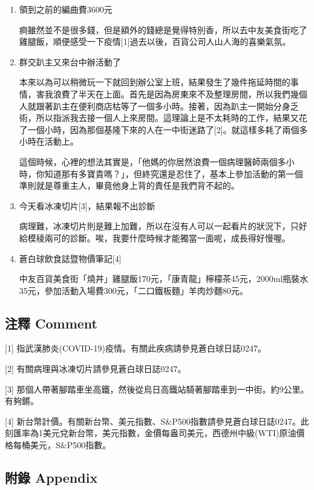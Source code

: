 \documentclass[a5paper, 11pt
]{book}
\begin{document}
\begin{enumerate}
\def\labelenumi{\arabic{enumi}.}
\item
  領到之前的編曲費3600元

  痾雖然並不是很多錢，但是額外的錢總是覺得特別香，所以去中友美食街吃了雞腿飯，順便感受一下疫情{[}1{]}過去以後，百貨公司人山人海的喜樂氣氛。
\item
  群交趴主又來台中辦活動了

  本來以為可以稍微玩一下就回到辦公室上班，結果發生了幾件拖延時間的事情，害我浪費了半天在上面。首先是因為房東來不及整理房間，所以我們幾個人就跟著趴主在便利商店枯等了一個多小時。接著，因為趴主一開始分身乏術，所以指派我去接一個人上來房間。這理論上是不太耗時的工作，結果又花了一個小時，因為那個基隆下來的人在一中街迷路了{[}2{]}。就這樣多耗了兩個多小時在活動上。

  這個時候，心裡的想法其實是，「他媽的你居然浪費一個病理醫師兩個多小時，你知道那有多寶貴嗎？」，但終究還是忍住了，基本上參加活動的第一個準則就是尊重主人，畢竟他身上背的責任是我們背不起的。
\item
  今天看冰凍切片{[}3{]}，結果報不出診斷

  病理難，冰凍切片則是難上加難，所以在沒有人可以一起看片的狀況下，只好給模稜兩可的診斷。唉，我要什麼時候才能獨當一面呢，成長得好慢喔。
\item
  蒼白球飲食誌暨物價筆記{[}4{]}

  中友百貨美食街「燒丼」雞腿飯170元，「康青龍」檸檬茶45元，2000ml瓶裝水35元，參加活動入場費300元，「二口鐵板麵」羊肉炒麵80元。
\end{enumerate}

\hypertarget{ux6ce8ux91cb-comment-47}{%
\subsection{注釋 Comment}\label{ux6ce8ux91cb-comment-47}}

{[}1{]} 指武漢肺炎(COVID-19)疫情。有關此疾病請參見蒼白球日誌0247。

{[}2{]} 有關病理與冰凍切片請參見蒼白球日誌0247。

{[}3{]}
那個人帶著腳踏車坐高鐵，然後從烏日高鐵站騎著腳踏車到一中街。約9公里。有夠鏘。

{[}4{]}
新台幣計價。有關新台幣、美元指數、S\&P500指數請參見蒼白球日誌0247。此刻匯率為1美元兌新台幣，美元指數，金價每盎司美元，西德州中級(WTI)原油價格每桶美元，S\&P500指數。

\hypertarget{ux9644ux9304-appendix-47}{%
\subsection{附錄 Appendix}\label{ux9644ux9304-appendix-47}}
\end{document}
